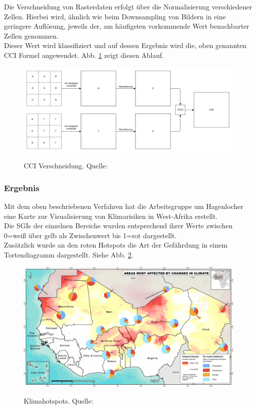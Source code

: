 \documentclass[10pt,conference,compsocconf]{IEEEtran}
\begin{document}
Die Verschneidung von Rasterdaten erfolgt über die Normalisierung verschiedener Zellen. Hierbei wird, ähnlich wie beim Downsampling von Bildern in eine geringere Auflösung, jeweils der, am häufigsten vorkommende Wert benachbarter Zellen genommen.\\
Dieser Wert wird klassifiziert und auf dessen Ergebnis wird die, oben genannten CCI Formel angewendet. Abb. \ref{img:CCIVerschneidung} zeigt diesen Ablauf. \\

\begin{figure}[H]
	\centering
	\includegraphics[width=1\columnwidth]{img/CCI_Verschneidung.png} \\
	\caption[]{CCI Verschneidung. Quelle: \cite{mariuszMaster}}
	\label{img:CCIVerschneidung}
\end{figure}

\subsubsection{Ergebnis}
Mit dem oben beschriebenen Verfahren hat die Arbeitsgruppe um Hagenlocher \cite{hagenlocher2014modeling} eine Karte zur Visualisierung von Klimarisiken in West-Afrika erstellt.\\
Die SGIs der einzelnen Bereiche wurden entsprechend ihrer Werte zwischen 0=weiß über gelb als Zwischenwert bis 1=rot dargestellt.\\
Zusätzlich wurde an den roten Hotspots die Art der Gefährdung in einem Tortendiagramm dargestellt. Siehe Abb. \ref{img:Klimahotspots}. \\

\begin{figure}[H]
	\centering
	\includegraphics[width=1\columnwidth]{img/climate_hotspots.png} \\
	\caption[]{Klimahotspots. Quelle: \cite{hagenlocher2014modeling}}
	\label{img:Klimahotspots}
\end{figure}
\end{document}
